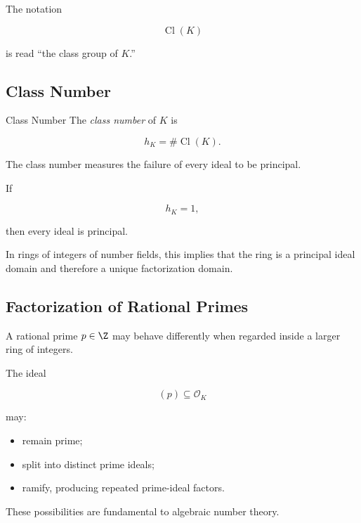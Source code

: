 The notation

\[ \operatorname{Cl}(K) \]

is read ``the class group of \(K\).''

\subsection{Class Number}
\label{subsec:class-number}

\begin{definitionbox}{Class Number}
The \emph{class number} of \(K\) is

\[ h_K=\#\operatorname{Cl}(K). \]
\end{definitionbox}

The class number measures the failure of every ideal to be principal.

If

\[ h_K=1, \]

then every ideal is principal.

In rings of integers of number fields, this implies that the ring is a
principal ideal domain and therefore a unique factorization domain.

\subsection{Factorization of Rational Primes}
\label{subsec:rational-prime-factorization}

A rational prime \(p\in\Z\) may behave differently when regarded inside a
larger ring of integers.

The ideal

\[ (p)\subseteq\mathcal O_K \]

may:

\begin{itemize}
    \item remain prime;
    \item split into distinct prime ideals;
    \item ramify, producing repeated prime-ideal factors.
\end{itemize}

These possibilities are fundamental to algebraic number theory.

